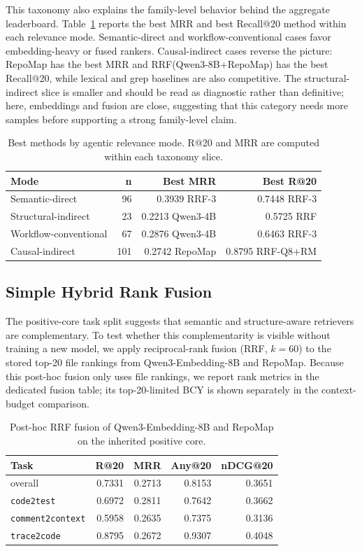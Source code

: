 \documentclass[11pt]{article}
\newcommand{\code}[1]{\texttt{#1}}
\begin{document}
This taxonomy also explains the family-level behavior behind the aggregate leaderboard. Table~\ref{tab:relevance-type-results} reports the best MRR and best Recall@20 method within each relevance mode. Semantic-direct and workflow-conventional cases favor embedding-heavy or fused rankers. Causal-indirect cases reverse the picture: RepoMap has the best MRR and RRF(Qwen3-8B+RepoMap) has the best Recall@20, while lexical and grep baselines are also competitive. The structural-indirect slice is smaller and should be read as diagnostic rather than definitive; here, embeddings and fusion are close, suggesting that this category needs more samples before supporting a strong family-level claim.

\begin{table}[t]
\centering
\caption{Best methods by agentic relevance mode. R@20 and MRR are computed within each taxonomy slice.}
\label{tab:relevance-type-results}
\begin{tabular}{lrrr}
\toprule
Mode & n & Best MRR & Best R@20 \\
\midrule
Semantic-direct & 96 & 0.3939 RRF-3 & 0.7448 RRF-3 \\
Structural-indirect & 23 & 0.2213 Qwen3-4B & 0.5725 RRF \\
Workflow-conventional & 67 & 0.2876 Qwen3-4B & 0.6463 RRF-3 \\
Causal-indirect & 101 & 0.2742 RepoMap & 0.8795 RRF-Q8+RM \\
\bottomrule
\end{tabular}
\end{table}

\subsection{Simple Hybrid Rank Fusion}

The positive-core task split suggests that semantic and structure-aware retrievers are complementary. To test whether this complementarity is visible without training a new model, we apply reciprocal-rank fusion (RRF, \(k=60\)) to the stored top-20 file rankings from Qwen3-Embedding-8B and RepoMap. Because this post-hoc fusion only uses file rankings, we report rank metrics in the dedicated fusion table; its top-20-limited BCY is shown separately in the context-budget comparison.

\begin{table}[t]
\centering
\caption{Post-hoc RRF fusion of Qwen3-Embedding-8B and RepoMap on the inherited positive core.}
\label{tab:rrf-fusion}
\begin{tabular}{lrrrr}
\toprule
Task & R@20 & MRR & Any@20 & nDCG@20 \\
\midrule
overall & 0.7331 & 0.2713 & 0.8153 & 0.3651 \\
\code{code2test} & 0.6972 & 0.2811 & 0.7642 & 0.3662 \\
\code{comment2context} & 0.5958 & 0.2635 & 0.7375 & 0.3136 \\
\code{trace2code} & 0.8795 & 0.2672 & 0.9307 & 0.4048 \\
\bottomrule
\end{tabular}
\end{table}
\end{document}
